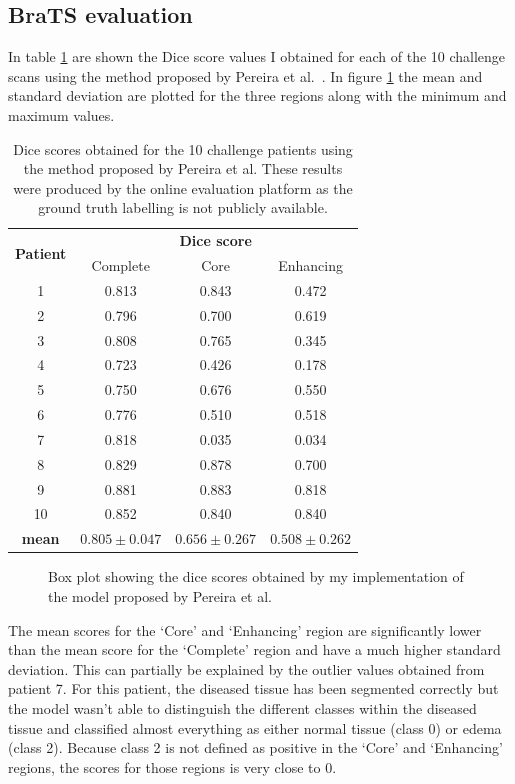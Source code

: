 \documentclass[12pt,a4paper,twoside,openright]{report}
\newlength\figureheight
\newlength\figurewidth
\begin{document}
\subsection{BraTS evaluation}
In table \ref{table:pereira_dice_results} are shown the Dice score values I obtained for each of the 10 challenge scans using the method proposed by Pereira et al.\ \cite{pereira}. In figure \ref{pereira_box_plot} the mean and standard deviation are plotted for the three regions along with the minimum and maximum values. \begin{table}
\centering	
\begin{tabular}{ c | c c c} 
\multirow{2}{*}{\textbf{Patient}} & \multicolumn{3}{c}{\textbf{Dice score}} \\
 & Complete & Core & Enhancing \\
 \hline
1 & 0.813 & 0.843 & 0.472 \\
2 & 0.796 & 0.700 & 0.619 \\
3 & 0.808 & 0.765 & 0.345 \\
4 & 0.723 & 0.426 & 0.178 \\
5 & 0.750 & 0.676 & 0.550 \\
6 & 0.776 & 0.510 & 0.518 \\
7 & 0.818 & 0.035 & 0.034 \\
8 & 0.829 & 0.878 & 0.700 \\
9 & 0.881 & 0.883 & 0.818 \\
10 & 0.852 & 0.840 & 0.840 \\
\hline
\rule{0pt}{3ex}    
\textbf{mean} & $0.805 \pm 0.047$ & $0.656 \pm 0.267$ & $0.508 \pm 0.262$
\end{tabular}
\caption{Dice scores obtained for the 10 challenge patients using the method proposed by Pereira et al. These results were produced by the online evaluation platform as the ground truth labelling is not publicly available.}
\label{table:pereira_dice_results}
\end{table}

\begin{figure}
	\centering
	\setlength\figureheight{10cm}
	\setlength{}
	
	\caption{Box plot showing the dice scores obtained by my implementation of the model proposed by Pereira et al.}
	\label{pereira_box_plot}
\end{figure}

The mean scores for the `Core' and `Enhancing' region are significantly lower than the mean score for the `Complete' region and have a much higher standard deviation. This can partially be explained by the outlier values obtained from patient 7. For this patient, the diseased tissue has been segmented correctly but the model wasn't able to distinguish the different classes within the diseased tissue and classified almost everything as either normal tissue (class 0) or edema (class 2). Because class 2 is not defined as positive in the `Core' and `Enhancing' regions, the scores for those regions is very close to 0.  
\end{document}
